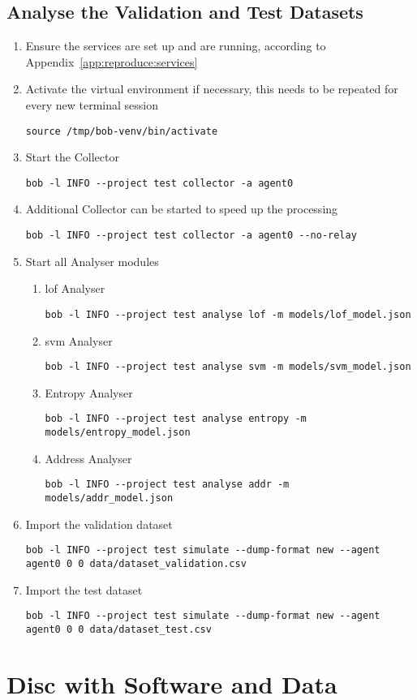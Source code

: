 \section{Analyse the Validation and Test Datasets}
\label{app:reproduce:run}

\begin{enumerate}
	\item Ensure the services are set up and are running, according to Appendix~\ref{app:reproduce:services}
	\item Activate the virtual environment if necessary, this needs to be repeated for every new terminal session
\begin{lstlisting}
source /tmp/bob-venv/bin/activate
\end{lstlisting}
	\item Start the Collector
\begin{lstlisting}
bob -l INFO --project test collector -a agent0
\end{lstlisting}
	\item Additional Collector can be started to speed up the processing
\begin{lstlisting}
bob -l INFO --project test collector -a agent0 --no-relay
\end{lstlisting}
	\item Start all Analyser modules
		\begin{enumerate}
			\item \gls{lof} Analyser
\begin{lstlisting}
bob -l INFO --project test analyse lof -m models/lof_model.json
\end{lstlisting}
			\item \gls{svm} Analyser
\begin{lstlisting}
bob -l INFO --project test analyse svm -m models/svm_model.json
\end{lstlisting}
			\item Entropy Analyser
\begin{lstlisting}
bob -l INFO --project test analyse entropy -m models/entropy_model.json
\end{lstlisting}
			\item Address Analyser
\begin{lstlisting}
bob -l INFO --project test analyse addr -m models/addr_model.json
\end{lstlisting}
		\end{enumerate}
	\item Import the validation dataset
\begin{lstlisting}
bob -l INFO --project test simulate --dump-format new --agent agent0 0 0 data/dataset_validation.csv
\end{lstlisting}
	\item Import the test dataset
\begin{lstlisting}
bob -l INFO --project test simulate --dump-format new --agent agent0 0 0 data/dataset_test.csv
\end{lstlisting}
\end{enumerate}

\begin{comment}
\begin{lstlisting}
\end{lstlisting}
\end{comment}

\chapter{Disc with Software and Data}
\label{app:disk}
